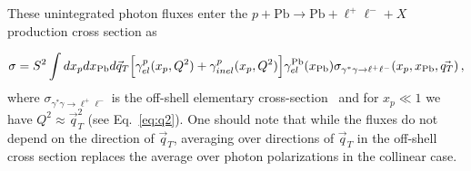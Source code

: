These unintegrated photon fluxes enter the $p+\textrm{Pb}\rightarrow \textrm{Pb} + \ell^+\ell^- + X$ production cross section as

\begin{equation}
\sigma = S^2 \int dx_p dx_{\rm Pb} d\vec{q}_T \Big[ \gamma^{p}_{el}(x_p, Q^2) + \gamma^{p}_{inel}(x_p,Q^2) \Big]
 \gamma^{\rm Pb}_{el}(x_{\rm Pb})
\sigma_{\gamma^{*}  \gamma \rightarrow \ell^+ \ell^-}(x_p, x_{\rm Pb}, \vec{q_T}) \,,
\label{kt_factorization_formula}
\end{equation}
%
where $\sigma_{\gamma^{*} \gamma \rightarrow \ell^+ \ell^-}$ is the off-shell elementary cross-section~\cite{daSilveira:2014jla} and  for  $x_p \ll 1$ we have $Q^2 \approx \vec{q}_T^2$ (see Eq.~\ref{eq:q2}).
One should note that while the fluxes do not depend on the direction of $\vec{q}_T$, averaging over directions
of $\vec{q}_T$ in the off-shell cross section replaces the average over photon polarizations in the collinear case.
